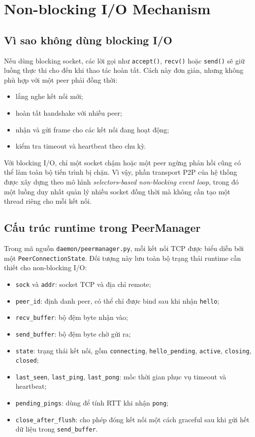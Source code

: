 \section{Non-blocking I/O Mechanism}

\subsection{Vì sao không dùng blocking I/O}
Nếu dùng blocking socket, các lời gọi như \texttt{accept()}, \texttt{recv()} hoặc \texttt{send()} sẽ giữ luồng thực thi cho đến khi thao tác hoàn tất. Cách này đơn giản, nhưng không phù hợp với một peer phải đồng thời:
\begin{itemize}[leftmargin=2em]
    \item lắng nghe kết nối mới;
    \item hoàn tất handshake với nhiều peer;
    \item nhận và gửi frame cho các kết nối đang hoạt động;
    \item kiểm tra timeout và heartbeat theo chu kỳ.
\end{itemize}

Với blocking I/O, chỉ một socket chậm hoặc một peer ngừng phản hồi cũng có thể làm toàn bộ tiến trình bị chặn. Vì vậy, phần transport P2P của hệ thống được xây dựng theo mô hình \textit{selectors-based non-blocking event loop}, trong đó một luồng duy nhất quản lý nhiều socket đồng thời mà không cần tạo một thread riêng cho mỗi kết nối.

\subsection{Cấu trúc runtime trong PeerManager}
Trong mã nguồn \texttt{daemon/peermanager.py}, mỗi kết nối TCP được biểu diễn bởi một \texttt{PeerConnectionState}. Đối tượng này lưu toàn bộ trạng thái runtime cần thiết cho non-blocking I/O:
\begin{itemize}[leftmargin=2em]
    \item \texttt{sock} và \texttt{addr}: socket TCP và địa chỉ remote;
    \item \texttt{peer\_id}: định danh peer, có thể chỉ được bind sau khi nhận \texttt{hello};
    \item \texttt{recv\_buffer}: bộ đệm byte nhận vào;
    \item \texttt{send\_buffer}: bộ đệm byte chờ gửi ra;
    \item \texttt{state}: trạng thái kết nối, gồm \texttt{connecting}, \texttt{hello\_pending}, \texttt{active}, \texttt{closing}, \texttt{closed};
    \item \texttt{last\_seen}, \texttt{last\_ping}, \texttt{last\_pong}: mốc thời gian phục vụ timeout và heartbeat;
    \item \texttt{pending\_pings}: dùng để tính RTT khi nhận \texttt{pong};
    \item \texttt{close\_after\_flush}: cho phép đóng kết nối một cách graceful sau khi gửi hết dữ liệu trong \texttt{send\_buffer}.
\end{itemize}


